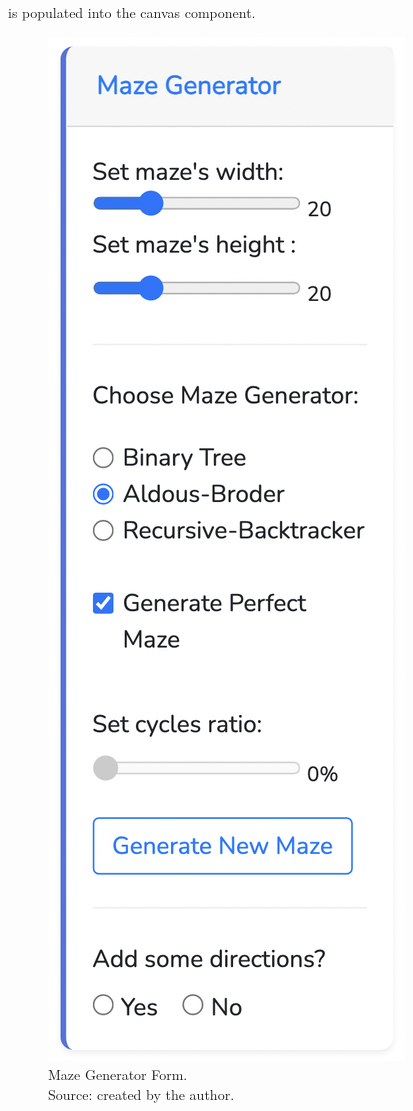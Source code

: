is populated into the canvas component.\\
\begin{figure}[!h]
    \centering
    \includegraphics[scale = 0.4]{mazeGenerator}
    \caption{Maze Generator Form.\\Source: created by the author.}
    \end{figure}

